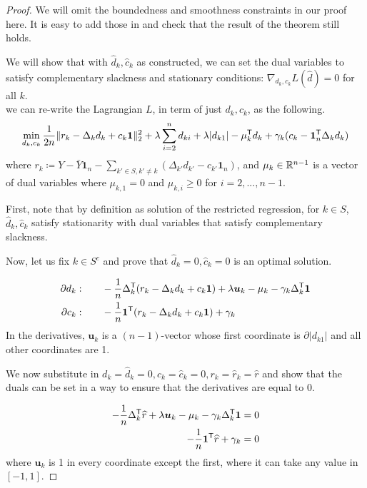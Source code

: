 \begin{proof}
We will omit the boundedness and smoothness constraints in our proof here. It is easy to add those in and check that the result of the theorem still holds.

We will show that with $\hat{d}_k, \hat{c}_k$ as constructed, we can set the dual variables to satisfy complementary slackness and stationary conditions: $\nabla_{d_k, c_k} L(\hat{d})  = 0$ for all $k$.\\ 

we can re-write the Lagrangian $L$, in term of just $d_k,c_k$, as the following.
\[
\min_{d_k, c_k}  \frac{1}{2n} \| r_k - \Delta_k d_k + c_k \mbox{\boldmath $1$} \|_2^2 
        + \lambda \sum_{i=2}^n d_{ki} + \lambda|d_{k1}| 
        - \mu_k^{\mathsf{T}} d_k + \gamma_k (c_k - \mbox{\boldmath $1$}_n^{\mathsf{T}}\Delta_k d_k)
\]
where $r_k \coloneqq Y - \bar{Y}\mathbf{1}_n - \sum_{k' \in S, k' \neq k} (\Delta_{k'} d_{k'} - c_{k'} \mathbf{1}_n) $, and $\mu_k \in {\mathbb R}^{n-1}$ is a vector of dual variables where $\mu_{k,1} = 0$ and $\mu_{k,i} \geq 0$ for $i=2,...,n-1$.

First, note that by definition as solution of the restricted regression, for $k \in S$, $\hat{d}_k, \hat{c}_k$ satisfy stationarity with dual variables that satisfy complementary slackness. 

Now, let us fix $k \in S^c$ and prove that $\hat{d}_k = 0, \hat{c}_k=0$ is an optimal solution. 

\begin{align*}
\partial d_k :& \qquad -\frac{1}{n} \Delta_k^{\mathsf{T}} ( r_k - \Delta_k d_k 
       + c_k \mbox{\boldmath $1$}) + \lambda \mbox{\boldmath $u$}_k  - \mu_k - \gamma_k \Delta_k^{\mathsf{T}} \mbox{\boldmath $1$} \\
\partial c_k: & \qquad -\frac{1}{n} \mbox{\boldmath $1$}^{\mathsf{T}} ( r_k - \Delta_k d_k 
       + c_k \mbox{\boldmath $1$}) + \gamma_k
\end{align*}
In the derivatives, $\mathbf{u}_k$ is a $(n-1)$-vector whose first coordinate is $\partial | d_{k1}|$ and all other coordinates are 1.

We now substitute in $d_k = \hat{d}_k = 0, c_k=\hat{c}_k=0, r_k = \hat{r}_k = \hat{r}$ and show that the duals can be set in a way to ensure that the derivatives are equal to 0.

\begin{align*}
-\frac{1}{n} \Delta_k^{\mathsf{T}}\widehat{r} + \lambda \mbox{\boldmath $u$}_k 
           - \mu_k - \gamma_k \Delta_k^{\mathsf{T}} \mbox{\boldmath $1$} &= 0 \\
-\frac{1}{n} \mbox{\boldmath $1$}^{\mathsf{T}} \widehat{r} + \gamma_k & = 0 \\
\end{align*}
where $\mathbf{u}_k$ is 1 in every coordinate except the first, where it can take any value in $[-1,1]$.


\end{proof}
